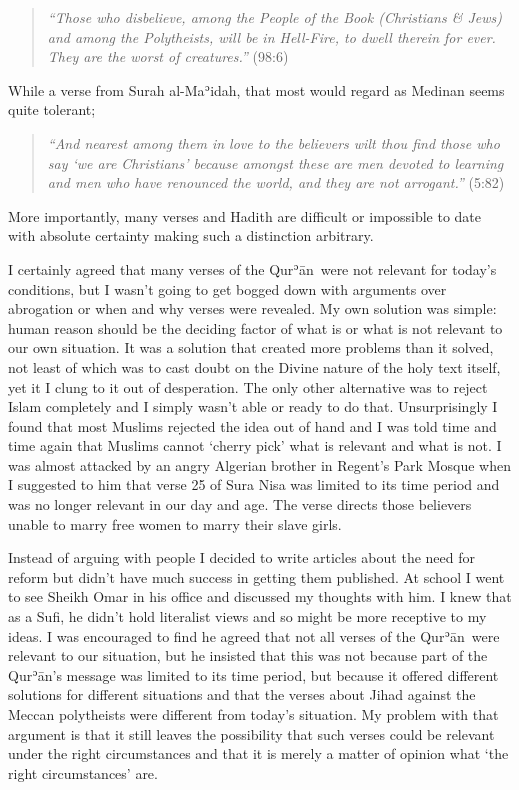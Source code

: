 \documentclass[12pt]{memoir}
\def\´{ʾ} %
\newcommand{\cor}[2]{#2} %
\def \Quran{Qur\-\´ān} %
\newcommand{\QRef}[1]{{\color{darkblue}#1}}
\begin{document}
\begin{quote}
\emph{“Those who disbelieve, among the People of the Book (Christians \& Jews)
and among the Polytheists, will be in Hell-Fire, to dwell therein for ever.
They are the worst of creatures.”}
(\QRef{98:6})
\end{quote}

While a verse from Surah al-Ma\´idah, that most would regard
as Medinan seems quite tolerant;

\begin{quote}
\emph{“And nearest among them in love to the believers wilt thou find those
who say ‘we are Christians’ because amongst these are men devoted to learning
and men who have renounced the world, and they are not arrogant.”}
(\QRef{5:82})
\end{quote}

More importantly, many verses and Hadith are difficult or impossible
to date with absolute certainty making such a distinction arbitrary.

I certainly agreed that many verses of the \Quran\ were not relevant
for today’s conditions, but I wasn’t going to get bogged down
with arguments over abrogation or when and why verses were revealed.
My own solution was simple:
human reason should be the deciding factor of what is
or what is not relevant to our own situation.
It was a solution that created more problems than it solved,
not least of which was to cast doubt on the Divine nature
of the holy text itself, yet it I clung to it out of desperation.
The only other alternative was to reject Islam completely
and I simply wasn’t able or ready to do that.
Unsurprisingly I found that most Muslims rejected the idea out of hand
and I was told time and time again that Muslims
cannot ‘cherry pick’ what is relevant and what is not.
I was almost attacked by an angry Algerian brother in Regent’s Park Mosque
when I suggested to him that verse 25 of Sura Nisa was limited
to it\cor{’}{}s time period and was no\cor{-}{ }longer
relevant in our day and age.
The verse directs those believers unable to marry free women
to marry their slave girls.

Instead of arguing with people I decided to write articles about the need
for reform but didn’t have much success in getting them published.
At school I went to see Sheikh Omar in his office
and discussed my thoughts with him.
I knew that as a Sufi, he didn’t hold literalist views
and so might be more receptive to my ideas.
I was encouraged to find he agreed that not all verses of the \Quran\
were relevant to our situation, but he insisted that this
was not because part of the \Quran’s message was limited to its time period,
but because it offered different solutions for different situations
and that the verses about Jihad against the Meccan polytheists
were different from today’s situation.
My problem with that argument is that it still leaves the possibility
that such verses could be relevant under the right circumstances
and that it is merely a matter of opinion what ‘the right circumstances’ are.
\end{document}

